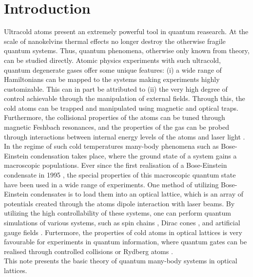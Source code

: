 \chapter{Introduction}

Ultracold atoms present an extremely powerful tool in quantum reasearch. At the scale of nanokelvins thermal effects no longer destroy the otherwise fragile quantum systems. Thus, quantum phenomena, otherwise only known from theory, can be studied directly. Atomic physics experiments with such ultracold, quantum degenerate gases offer some unique features: (i) a wide range of Hamiltonians can be mapped to the systems making experiments highly customizable. This can in part be attributed to (ii) the very high degree of control achievable through the manipulation of external fields. Through this, the cold atoms can be trapped and manipulated using magnetic and optical traps. Furthermore, the collisional properties of the atoms can be tuned through magnetic Feshbach resonances, and the properties of the gas can be probed through interactions between internal energy levels of the atoms and laser light \cite{JakschZoller, Bloch2012}.\\
In the regime of such cold temperatures many-body phenomena such as Bose-Einstein condensation takes place, where the ground state of a system gains a macroscopic populations. Ever since the first realisation of a Bose-Einstein condensate in 1995 \cite{WiemanCornell1995}, the special properties of this macroscopic quantum state have been used in a wide range of experiments. One method of utilizing Bose-Einstein condensates is to load them into an optical lattice, which is an array of potentials created through the atoms dipole interaction with laser beams. By utilizing the high controllability of these systems, one can perform quantum simulations of various systems, such as spin chains \cite{Simon2011}, Dirac cones \cite{Tarruell2012}, and artificial gauge fields \cite{Dalibard2011}. Furtermore, the properties of cold atoms in optical lattices is very favourable for experiments in quantum information, where quantum gates can be realised through controlled collisions \cite{Zoller1999} or Rydberg atoms \cite{Molmer2010}.\\

This note presents the basic theory of quantum many-body systems in optical lattices.
\newpage